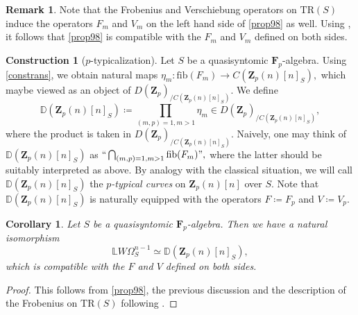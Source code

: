 \documentclass[10pt,letterpaper]{amsart}
\numberwithin{figure}{section}
\numberwithin{equation}{section}
\newtheorem{corollary}[figure]{Corollary}
\theoremstyle{definition}
\theoremstyle{definition}
\newtheorem{remark}[figure]{Remark}
\theoremstyle{definition}
\theoremstyle{definition}
\newtheorem{construction}[figure]{Construction}
\newcommand{\LL}{\L}
\newcommand{\TR}{\mathrm{TR}}
\renewcommand{\L}{\mathbb{L}}
\newcommand{\Z}{\mathbf{Z}}
\newcommand{\F}{\mathbf{F}}
\begin{document}
\begin{remark}
    Note that the Frobenius and Verschiebung operators on $\TR(S)$ induce the operators $F_m$ and $V_m$ on the left hand side of \cref{prop98} as well. Using \cite[Rmk.~2.4.6]{Jonas}, it follows that \cref{prop98} is compatible with the $F_m$ and $V_m$ defined on both sides.
\end{remark}{}

\begin{construction}[$p$-typicalization]\label{ptypica}
Let $S$ be a quasisyntomic $\mathbf F_p$-algebra. Using \cref{constrans}, we obtain natural maps $\eta_m\colon \mathrm{fib} (F_m) \to C (\mathbf{Z}_p(n)[n]_S),$ which maybe viewed as an object of $D(\mathbf Z_p)_{/C (\mathbf{Z}_p(n)[n]_S)}.$ We define $$\mathbb{D}(\Z_p(n)[n]_S) \coloneqq \prod_{(m,p)=1, m>1}\eta_m \in D(\mathbf Z_p)_{/C (\mathbf{Z}_p(n)[n]_S)},$$ where the product is taken in $D(\mathbf Z_p)_{/C (\mathbf{Z}_p(n)[n]_S)}$. Naively, one may think of $\mathbb{D}(\Z_p(n)[n]_S)$ as $``\bigcap_{(m,p)=1, m>1} \mathrm{fib}(F_m)",$ where the latter should be suitably interpreted as above. By analogy with the classical situation, we will call $\mathbb{D}(\Z_p(n)[n]_S)$ the \emph{$p$-typical curves} on $\mathbf Z_p(n)[n]$ over $S.$ Note that $\mathbb{D}(\Z_p(n)[n]_S)$ is naturally equipped with the operators $F\coloneqq F_p$ and $V\coloneqq V_p$.
\end{construction}{}


\begin{corollary}Let $S$ be a quasisyntomic $\F_p$-algebra. Then we have a natural isomorphism 
$$ \LL W \Omega_S^{n-1} \simeq \mathbb{D}(\Z_p(n)[n]_S),$$ which is compatible with the $F$ and $V$ defined on both sides.
\end{corollary}{}

\begin{proof}
This follows from \cref{prop98}, the previous discussion and the description of the Frobenius on $\TR(S)$ following \cite[Prop.~3.3.1]{Hess}.   
\end{proof}{}


\end{document}

